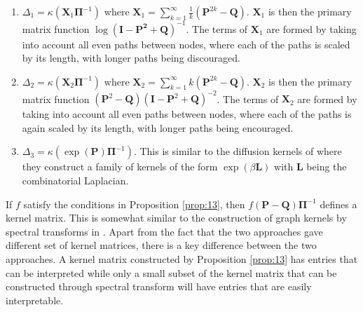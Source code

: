 \begin{enumerate}
\item $\Delta_1 = \kappa(\mathbf{X}_1\bm{\Pi}^{-1})$ where
  $\mathbf{X}_1 = \sum_{k=1}^{\infty}{\tfrac{1}{k}(\mathbf{P}^{2k} -
    \mathbf{Q})}$. $\mathbf{X}_1$ is then the primary matrix function
  $\log{(\mathbf{I} - \mathbf{P^2} + \mathbf{Q})^{-1}}$. The terms of
  $\mathbf{X}_1$ are formed by taking into account all even paths
  between nodes, where each of the paths is scaled by its length, with
  longer paths being discouraged.
\item $\Delta_{2} = \kappa(\mathbf{X}_2\bm{\Pi}^{-1})$ where $\mathbf{X}_2 =
  \sum_{k=1}^{\infty}{k(\mathbf{P}^{2k} - \mathbf{Q})}$. $\mathbf{X}_2$
  is then the primary matrix function $(\mathbf{P}^2 -
  \mathbf{Q})(\mathbf{I} - \mathbf{P}^2 + \mathbf{Q})^{-2}$. The terms
  of $\mathbf{X}_2$ are formed by taking
  into account all even paths between nodes, where each of the paths is
  again scaled by its length, with longer paths being encouraged.
\item $\Delta_{3} = \kappa(\exp(\mathbf{P})\bm{\Pi}^{-1})$. This is
  similar to the diffusion kernels of \citet{kondor02:_diffus} where
  they construct a family of kernels of the form $\exp(\beta
  \mathbf{L})$ with $\mathbf{L}$ being the combinatorial Laplacian.
\end{enumerate}
%
%
If $f$ satisfy the conditions in Proposition \ref{prop:13}, then
$f(\mathbf{P} - \mathbf{Q})\bm{\Pi}^{-1}$ defines a kernel
matrix. This is somewhat similar to the construction of graph kernels
by spectral transforms in
\citet{zhu05:_semi,chapelle03:_clust_kernel_semi_super_learn,smola03:_kernel}.
Apart from the fact that the two approaches gave different set of
kernel matrices, there is a key difference between the two
approaches. A kernel matrix constructed by Proposition \ref{prop:13}
has entries that can be interpreted while only a small subset of the
kernel matrix that can be constructed through spectral transform will
have entries that are easily interpretable.
